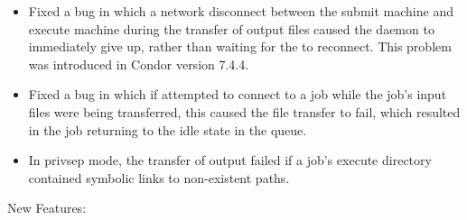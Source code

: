 \begin{itemize}
\begin{itemize}
  \item Fixed a bug in which
  a network disconnect between the submit machine and execute
  machine during the transfer of output files caused the
   daemon to immediately give up, rather than waiting
  for the  to reconnect.  This problem was introduced
  in Condor version 7.4.4.

  \item Fixed a bug in which
  if  attempted to connect to a job while the
  job's input files were being transferred, this caused the file
  transfer to fail, which resulted in the job returning to the idle
  state in the queue.

  \item In privsep mode, the transfer of output failed if a job's execute
  directory contained symbolic links to non-existent paths.

  \end{itemize}
\end{itemize}


\noindent New Features:

